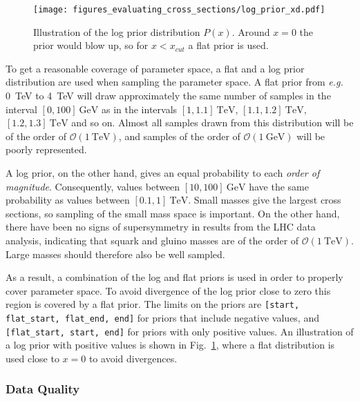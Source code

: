 \documentclass[twoside,english]{uiofysmaster}
\begin{document}
{{\begin{figure}
\centering
\texttt{[image: figures\_evaluating\_cross\_sections/log\_prior\_xd.pdf]}
\caption{Illustration of the log prior distribution $P(x)$. Around $x=0$ the prior would blow up, so for $x < x_{cut}$ a flat prior is used.}
\label{Fig:: evaluating cross : prior illustration}
\end{figure}

To get a reasonable coverage of parameter space, a flat and a log prior distribution are used when sampling the parameter space. A flat prior from \textit{e.g.} 0~TeV to 4~TeV will draw approximately the same number of samples in the interval $[0, 100]~\mathrm{GeV}$ as in the intervals $[1,1.1]~\mathrm{TeV}$, $[1.1,1.2]~\mathrm{TeV}$,  $[1.2,1.3]~\mathrm{TeV}$ and so on. Almost all samples drawn from this distribution will be of the order of $\mathcal{O}(1~\mathrm{TeV})$, and samples of the order of $\mathcal{O}( 1~\mathrm{GeV})$ will be poorly represented.

A log prior, on the other hand, gives an equal probability to each \textit{order of magnitude}. Consequently, values between $[10,100]~\mathrm{GeV}$ have the same probability as values between $[0.1,1]~\mathrm{TeV}$. Small masses give the largest cross sections, so sampling of the small mass space is important. On the other hand, there have been no signs of supersymmetry in results from the LHC data analysis, indicating that squark and gluino masses are of the order of $\mathcal{O}(1~\mathrm{TeV})$. Large masses should therefore also be well sampled. 

As a result, a combination of the log and flat priors is used in order to properly cover parameter space. To avoid divergence of the log prior close to zero this region is covered by a flat prior. The limits on the priors are \verb|[start, flat_start, flat_end, end]| for priors that include negative values, and \verb|[flat_start, start, end]| for priors with only positive values. An illustration of a log prior with positive values is shown in Fig.~\ref{Fig:: evaluating cross : prior illustration}, where a flat distribution is used close to $x=0$ to avoid divergences.





\subsubsection{Data Quality}\label{Sec:: evaluating cross : Data Quality}

}}
\end{document}
